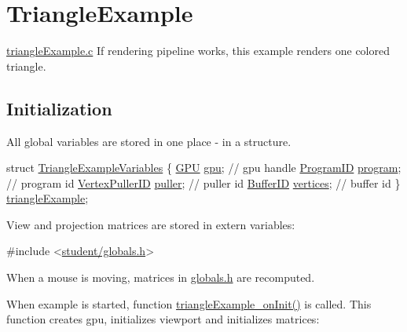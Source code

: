 \hypertarget{TriangleExample-example}{\section{Triangle\-Example}
}
\hyperlink{triangleExample_8c}{triangle\-Example.\-c}  If rendering pipeline works, this example renders one colored triangle. \par
 \hypertarget{triangleExample.c_Initialization}{}\subsection{Initialization}\label{triangleExample.c_Initialization}
All global variables are stored in one place -\/ in a structure. 
\begin{DoxyCodeInclude}

\textcolor{keyword}{struct }\hyperlink{structTriangleExampleVariables}{TriangleExampleVariables} \{
  \hyperlink{fwd_8h_a06964ec111fe28721d8618b6d0d993bf}{GPU} \hyperlink{structTriangleExampleVariables_a6c5c3f82065ae9aac07f9e6f11dd03b3}{gpu};  \textcolor{comment}{// gpu handle}
\textcolor{comment}{}  \hyperlink{fwd_8h_a15e62786033208aec9487a51e808f81d}{ProgramID} \hyperlink{structTriangleExampleVariables_aabf788228d2e91e2718facfbd911c8cc}{program};  \textcolor{comment}{// program id}
\textcolor{comment}{}  \hyperlink{fwd_8h_a23828e2281a794e193ebaf0df3e1f17c}{VertexPullerID} \hyperlink{structTriangleExampleVariables_a82e39dd0d18fc57422686229d801e39f}{puller};  \textcolor{comment}{// puller id}
\textcolor{comment}{}  \hyperlink{fwd_8h_a60a12bf4868ebe47cc571ce96a03f99c}{BufferID} \hyperlink{structTriangleExampleVariables_acb7968b625f2e01866994769209cf32e}{vertices};  \textcolor{comment}{// buffer id}
\} \hyperlink{triangleExample_8c_a235d77635ad30ec86f81d2caabbdc1b5}{triangleExample};  

\end{DoxyCodeInclude}
View and projection matrices are stored in extern variables\-: 
\begin{DoxyCodeInclude}
\textcolor{preprocessor}{#include <\hyperlink{globals_8h}{student/globals.h}>}
\end{DoxyCodeInclude}
When a mouse is moving, matrices in \hyperlink{globals_8h}{globals.\-h} are recomputed.\par
 When example is started, function \hyperlink{triangleExample_8c_a73184b4ab6bb513ad9a9a4c36e92646b}{triangle\-Example\-\_\-on\-Init()} is called. This function creates gpu, initializes viewport and initializes matrices\-: 
